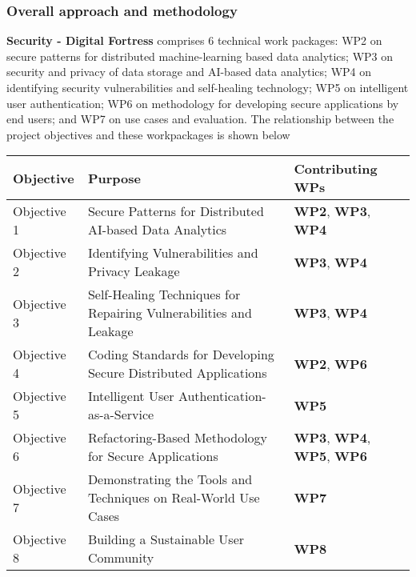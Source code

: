 \documentclass[a4paper,11pt]{article}
\newcommand{\project}[1]{\textbf{#1}\xspace}
\newcommand{\SECURITY}{\project{Security - Digital Fortress}}
\newcommand{\TheProject}{\SECURITY}
\begin{document}
\subsubsection{Overall approach and methodology}


\TheProject{} comprises 6 technical work packages: WP2 on secure patterns for distributed machine-learning based data analytics; WP3 on security and privacy of data storage and AI-based data analytics; WP4 on identifying security vulnerabilities and self-healing technology; WP5 on intelligent user authentication; WP6 on methodology for developing secure applications by end users; and WP7 on use cases and evaluation. The relationship between the project objectives and these workpackages is shown below

\vspace{-8pt}
\begin{center}
\begin{tabular}{|l|l|l|}\hline
\textbf{Objective} & \textbf{Purpose} & \textbf{Contributing WPs} \\\hline \hline
Objective 1 & Secure Patterns for Distributed AI-based Data Analytics & \textbf{WP2}, \textbf{WP3}, \textbf{WP4} \\\hline
Objective 2 & Identifying Vulnerabilities and Privacy Leakage & \textbf{WP3}, \textbf{WP4} \\\hline
Objective 3 & Self-Healing Techniques for Repairing Vulnerabilities and Leakage & \textbf{WP3}, \textbf{WP4} \\\hline
Objective 4 & Coding Standards for Developing Secure Distributed Applications & \textbf{WP2}, \textbf{WP6} \\\hline
Objective 5 & Intelligent User Authentication-as-a-Service & \textbf{WP5} \\\hline
Objective 6 & Refactoring-Based Methodology for Secure Applications & \textbf{WP3}, \textbf{WP4}, \textbf{WP5}, \textbf{WP6} \\\hline
Objective 7 & Demonstrating the Tools and Techniques on Real-World Use Cases & \textbf{WP7}\\\hline
Objective 8 & Building a Sustainable User Community & \textbf{WP8}\\\hline
\end{tabular}
\end{center}
\end{document}
